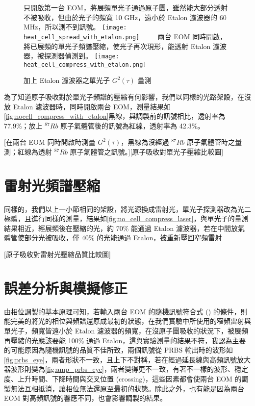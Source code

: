 \documentclass[class=NCU_thesis, crop=false]{standalone}
\begin{document}
\begin{figure}[!hbt]
    \centering
    \subcaptionbox
        {只開啟第一台 EOM，將展頻單光子通過原子團，雖然能大部分透射不被吸收，但由於光子的頻寬 10 GHz，遠小於 Etalon 濾波器的 60 MHz，所以測不到訊號。
        \label{fig:spread_single_photon_with_etalon}}
        {\texttt{[image: heat\_cell\_spread\_with\_etalon.png]}}
    ~~~~
    \subcaptionbox
        {兩台 EOM 同時開啟，將已展頻的單光子頻譜壓縮，使光子再次現形，能透射 Etalon 濾波器，被探測器偵測到。
        \label{fig:compress_single_photon_with_etalon}}
        {\texttt{[image: heat\_cell\_compress\_with\_etalon.png]}}
    \caption{加上 Etalon 濾波器之單光子 $G^{2}(\tau)$ 量測}
    \label{fig:single_photon_with_etalon}
\end{figure}

為了知道原子吸收對於單光子頻譜的壓縮有何影響，我們以同樣的光路架設，在沒放 Etalon 濾波器時，同時開啟兩台 EOM，測量結果如\cref{fig:nocell_compress_with_etalon}黑線，與調製前的訊號相比，透射率為 77.9\%；放上 $^{87}Rb$ 原子氣體管後的訊號為紅線，透射率為 42.3\%。

[在兩台 EOM 同時開啟時測量 $G^{2}(\tau)$，黑線為沒經過 $^{87}Rb$ 原子氣體管時之量測；紅線為透射 $^{87}Rb$ 原子氣體管之訊號。][原子吸收對單光子壓縮比較圖]

\section{雷射光頻譜壓縮}

同樣的，我們以上一小節相同的架設，將光源換成雷射光，單光子探測器改為光二極體，且進行同樣的測量，結果如\cref{fig:no_cell_compress_laser}，與單光子的量測結果相近，經展頻後在壓縮的光，約 70\% 能通過 Etalon 濾波器，若在中間放氣體管使部分光被吸收，僅 40\% 的光能通過 Etalon，被重新壓回窄頻雷射

[原子吸收對雷射光壓縮品質比較圖]

\section{誤差分析與模擬修正}

由相位調製的基本原理可知，若輸入兩台 EOM 的隨機訊號符合式 () 的條件，則能完美的將光的相位與頻譜還原成最初的狀態，在我們實驗中所使用的窄頻雷射與單光子，頻寬皆遠小於 Etalon 濾波器的頻寬，在沒原子團吸收的狀況下，被展頻再壓縮的光應該要能 100\% 通過 Etalon，這與實驗測量的結果不符，我認為主要的可能原因為隨機訊號的品質不佳所致，兩個訊號從 PRBS 輸出時的波形如\cref{fig:prbs_eye}，兩者形狀不一致，且上下不對稱，若在經過延長線與高頻訊號放大器波形則變為\cref{fig:amp_prbs_eye}，兩者變得更不一致，有著不一樣的波形、穩定度、上升時間、下降時間與交叉位置 (crossing)，這些因素都會使兩台 EOM 的調製無法互相抵消，讓相位無法還原至最初的狀態。除此之外，也有能是因為兩台 EOM 對高頻訊號的響應不同，也會影響調製的結果。
\end{document}
